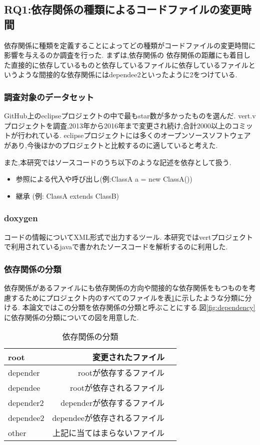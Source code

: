 \documentclass[submit,ses,noauthor]{ipsj} %
\begin{document}
\subsection{RQ1:依存関係の種類によるコードファイルの変更時間}
依存関係に種類を定義することによってどの種類がコードファイルの変更時間に影響を与えるのか調査を行った.
まずは,依存関係の
依存関係の距離にも着目した直接的に依存しているものと依存しているファイルに依存しているファイルというような間接的な依存関係にはdependee2といったように2をつけている.


\subsubsection{調査対象のデータセット}
GitHub上のeclipseプロジェクトの中で最もstar数が多かったものを選んだ.
vert.vプロジェクトを調査,2013年から2016年まで変更され続け,合計2000以上のコミットが行われている.
eclipseプロジェクトには多くのオープンソースソフトウェアがあり,今後ほかのプロジェクトと比較するのに適していると考えた.

また,本研究ではソースコードのうち以下のような記述を依存として扱う.
\begin{itemize}
\item 参照による代入や呼び出し(例:ClassA a = new ClassA())
\item 継承 (例: ClassA extends ClassB)
\end{itemize}

\subsubsection{doxygen}
コードの情報についてXML形式で出力するツール.
本研究ではvertプロジェクトで利用されているjavaで書かれたソースコードを解析するのに利用した.


\subsubsection{依存関係の分類}
依存関係があるファイルにも依存関係の方向や間接的な依存関係をもつものを考慮するためにプロジェクト内のすべてのファイルを表\ref{tab:依存関係の分類}に示したような分類に分ける.
本論文ではこの分類を依存関係の分類と呼ぶことにする.図\ref{fig:dependency}に依存関係の分類についての図を用意した.

\begin{table}
\caption{依存関係の分類}
\begin{tabular}{|l|r|r|} \hline
root & 変更されたファイル \\ \hline
depender & rootが依存するファイル \\ \hline
dependee & rootが依存されるファイル \\ \hline
depender2 & dependerが依存するファイル \\ \hline
dependee2 & dependeeが依存されるファイル \\ \hline
other & 上記に当てはまらないファイル \\ \hline
\end{tabular}
\label{tab:依存関係の分類}
\end{table}
\end{document}
